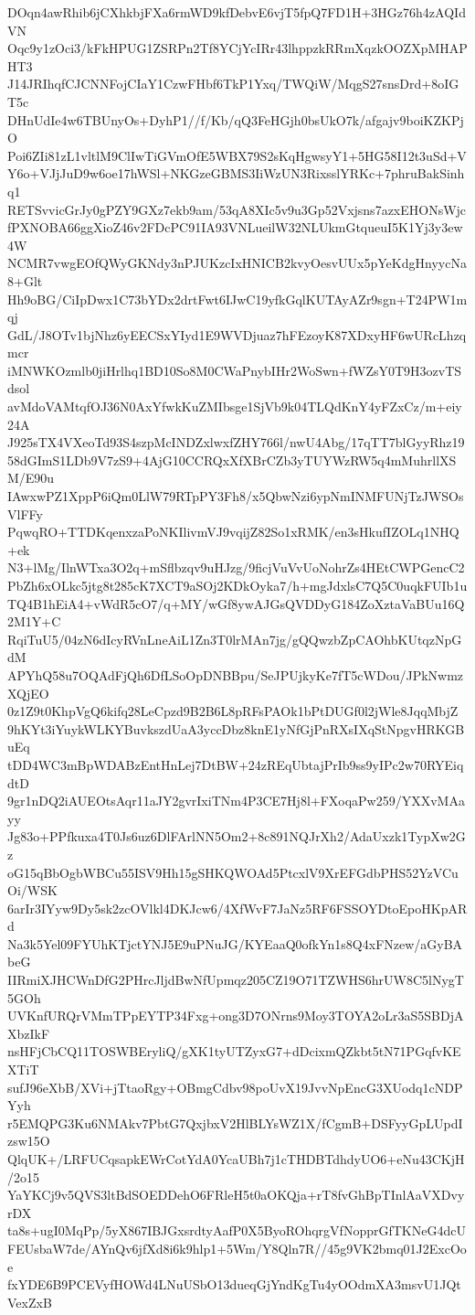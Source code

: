 DOqn4awRhib6jCXhkbjFXa6rmWD9kfDebvE6vjT5fpQ7FD1H+3HGz76h4zAQIdVN
Oqc9y1zOci3/kFkHPUG1ZSRPn2Tf8YCjYcIRr43lhppzkRRmXqzkOOZXpMHAPHT3
J14JRIhqfCJCNNFojCIaY1CzwFHbf6TkP1Yxq/TWQiW/MqgS27snsDrd+8oIGT5c
DHnUdIe4w6TBUnyOs+DyhP1//f/Kb/qQ3FeHGjh0bsUkO7k/afgajv9boiKZKPjO
Poi6ZIi81zL1vltlM9ClIwTiGVmOfE5WBX79S2sKqHgwsyY1+5HG58I12t3uSd+V
Y6o+VJjJuD9w6oe17hWSl+NKGzeGBMS3IiWzUN3RixsslYRKc+7phruBakSinhq1
RETSvvicGrJy0gPZY9GXz7ekb9am/53qA8XIc5v9u3Gp52Vxjsns7azxEHONsWjc
fPXNOBA66ggXioZ46v2FDcPC91IA93VNLueilW32NLUkmGtqueuI5K1Yj3y3ew4W
NCMR7vwgEOfQWyGKNdy3nPJUKzcIxHNICB2kvyOesvUUx5pYeKdgHnyycNa8+Glt
Hh9oBG/CiIpDwx1C73bYDx2drtFwt6IJwC19yfkGqlKUTAyAZr9sgn+T24PW1mqj
GdL/J8OTv1bjNhz6yEECSxYIyd1E9WVDjuaz7hFEzoyK87XDxyHF6wURcLhzqmcr
iMNWKOzmlb0jiHrlhq1BD10So8M0CWaPnybIHr2WoSwn+fWZsY0T9H3ozvTSdsol
avMdoVAMtqfOJ36N0AxYfwkKuZMIbsge1SjVb9k04TLQdKnY4yFZxCz/m+eiy24A
J925sTX4VXeoTd93S4szpMcINDZxlwxfZHY766l/nwU4Abg/17qTT7blGyyRhz19
58dGImS1LDb9V7zS9+4AjG10CCRQxXfXBrCZb3yTUYWzRW5q4mMuhrllXSM/E90u
IAwxwPZ1XppP6iQm0LlW79RTpPY3Fh8/x5QbwNzi6ypNmINMFUNjTzJWSOsVlFFy
PqwqRO+TTDKqenxzaPoNKIlivmVJ9vqijZ82So1xRMK/en3sHkufIZOLq1NHQ+ek
N3+lMg/IlnWTxa3O2q+mSflbzqv9uHJzg/9ficjVuVvUoNohrZs4HEtCWPGencC2
PbZh6xOLkc5jtg8t285cK7XCT9aSOj2KDkOyka7/h+mgJdxlsC7Q5C0uqkFUIb1u
TQ4B1hEiA4+vWdR5cO7/q+MY/wGf8ywAJGsQVDDyG184ZoXztaVaBUu16Q2M1Y+C
RqiTuU5/04zN6dIcyRVnLneAiL1Zn3T0lrMAn7jg/gQQwzbZpCAOhbKUtqzNpGdM
APYhQ58u7OQAdFjQh6DfLSoOpDNBBpu/SeJPUjkyKe7fT5cWDou/JPkNwmzXQjEO
0z1Z9t0KhpVgQ6kifq28LeCpzd9B2B6L8pRFsPAOk1bPtDUGf0l2jWle8JqqMbjZ
9hKYt3iYuykWLKYBuvkszdUaA3yccDbz8knE1yNfGjPnRXsIXqStNpgvHRKGBuEq
tDD4WC3mBpWDABzEntHnLej7DtBW+24zREqUbtajPrIb9ss9yIPc2w70RYEiqdtD
9gr1nDQ2iAUEOtsAqr11aJY2gvrIxiTNm4P3CE7Hj8l+FXoqaPw259/YXXvMAayy
Jg83o+PPfkuxa4T0Js6uz6DlFArlNN5Om2+8c891NQJrXh2/AdaUxzk1TypXw2Gz
oG15qBbOgbWBCu55ISV9Hh15gSHKQWOAd5PtcxlV9XrEFGdbPHS52YzVCuOi/WSK
6arIr3IYyw9Dy5sk2zcOVlkl4DKJcw6/4XfWvF7JaNz5RF6FSSOYDtoEpoHKpARd
Na3k5Yel09FYUhKTjctYNJ5E9uPNuJG/KYEaaQ0ofkYn1s8Q4xFNzew/aGyBAbeG
IIRmiXJHCWnDfG2PHrcJljdBwNfUpmqz205CZ19O71TZWHS6hrUW8C5lNygT5GOh
UVKnfURQrVMmTPpEYTP34Fxg+ong3D7ONrns9Moy3TOYA2oLr3aS5SBDjAXbzIkF
nsHFjCbCQ11TOSWBEryliQ/gXK1tyUTZyxG7+dDcixmQZkbt5tN71PGqfvKEXTiT
sufJ96eXbB/XVi+jTtaoRgy+OBmgCdbv98poUvX19JvvNpEncG3XUodq1cNDPYyh
r5EMQPG3Ku6NMAkv7PbtG7QxjbxV2HlBLYsWZ1X/fCgmB+DSFyyGpLUpdIzsw15O
QlqUK+/LRFUCqsapkEWrCotYdA0YcaUBh7j1cTHDBTdhdyUO6+eNu43CKjH/2o15
YaYKCj9v5QVS3ltBdSOEDDehO6FRleH5t0aOKQja+rT8fvGhBpTInlAaVXDvyrDX
ta8s+ugI0MqPp/5yX867IBJGxsrdtyAafP0X5ByoROhqrgVfNopprGfTKNeG4dcU
FEUsbaW7de/AYnQv6jfXd8i6k9hlp1+5Wm/Y8Qln7R//45g9VK2bmq01J2ExcOoe
fxYDE6B9PCEVyfHOWd4LNuUSbO13dueqGjYndKgTu4yOOdmXA3msvU1JQtVexZxB
